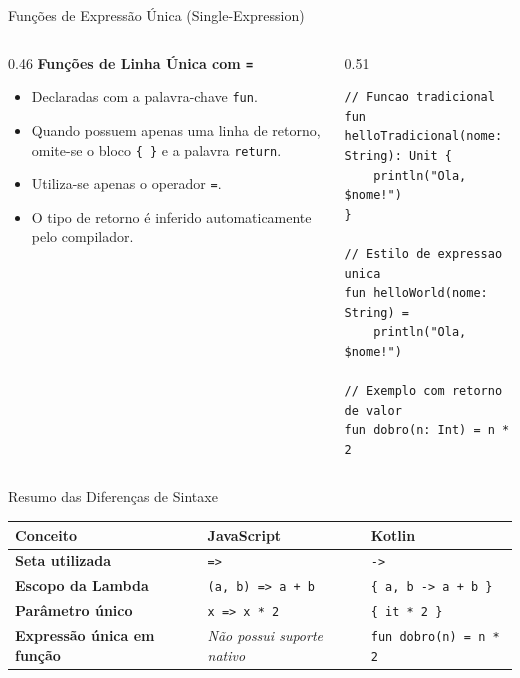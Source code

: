 \documentclass[aspectratio=169]{beamer}
\begin{document}
\begin{frame}[fragile]{Funções de Expressão Única (Single-Expression)}
  \begin{columns}[T]
    \begin{column}{0.46\textwidth}
      \textbf{Funções de Linha Única com \texttt{=}}
      \vspace{0.3em}
      \begin{itemize}\small
        \item Declaradas com a palavra-chave \texttt{fun}.
        \item Quando possuem apenas uma linha de retorno, omite-se o bloco \texttt{\{ \}} e a palavra \texttt{return}.
        \item Utiliza-se apenas o operador \texttt{=}.
        \item O tipo de retorno é inferido automaticamente pelo compilador.
      \end{itemize}
    \end{column}
    \begin{column}{0.51\textwidth}
\begin{lstlisting}[style=KotlinStyle]
// Funcao tradicional
fun helloTradicional(nome: String): Unit {
    println("Ola, $nome!")
}

// Estilo de expressao unica
fun helloWorld(nome: String) = 
    println("Ola, $nome!")

// Exemplo com retorno de valor
fun dobro(n: Int) = n * 2
\end{lstlisting}
    \end{column}
  \end{columns}
\end{frame}

\begin{frame}{Resumo das Diferenças de Sintaxe}
  \vspace{0.5em}
  \centering
  \begin{table}
    \small
    \begin{tabular}{l l l}
      \toprule
      \textbf{Conceito} & \textbf{JavaScript} & \textbf{Kotlin} \\
      \midrule
      \textbf{Seta utilizada} & \texttt{=>} & \texttt{->} \\[4pt]
      \textbf{Escopo da Lambda} & \texttt{(a, b) => a + b} & \texttt{\{ a, b -> a + b \}} \\[4pt]
      \textbf{Parâmetro único} & \texttt{x => x * 2} & \texttt{\{ it * 2 \}} \\[4pt]
      \textbf{Expressão única em função} & \textit{Não possui suporte nativo} & \texttt{fun dobro(n) = n * 2} \\
      \bottomrule
    \end{tabular}
  \end{table}
\end{frame}
\end{document}
